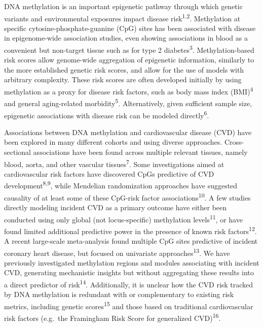 \documentclass[]{article}
\begin{document}
DNA methylation is an important epigenetic pathway through which genetic
variants and environmental exposures impact disease
risk\textsuperscript{1,2}. Methylation at specific
cytosine-phosphate-guanine (CpG) sites has been associated with disease
in epigenome-wide association studies, even showing associations in
blood as a convenient but non-target tissue such as for type 2
diabetes\textsuperscript{3}. Methylation-based risk scores allow
genome-wide aggregation of epigenetic information, similarly to the more
established genetic risk scores, and allow for the use of models with
arbitrary complexity. These risk scores are often developed initially by
using methylation as a proxy for disease risk factors, such as body mass
index (BMI)\textsuperscript{4} and general aging-related
morbidity\textsuperscript{5}. Alternatively, given sufficient sample
size, epigenetic associations with disease risk can be modeled
directly\textsuperscript{6}.

Associations between DNA methylation and cardiovascular disease (CVD)
have been explored in many different cohorts and using diverse
approaches. Cross-sectional associations have been found across multiple
relevant tissues, namely blood, aorta, and other vascular
tissues\textsuperscript{7}. Some investigations aimed at cardiovascular
risk factors have discovered CpGs predictive of CVD
development\textsuperscript{8,9}, while Mendelian randomization
approaches have suggested causality of at least some of these CpG-risk
factor associations\textsuperscript{10}. A few studies directly modeling
incident CVD as a primary outcome have either been conducted using only
global (not locus-specific) methylation levels\textsuperscript{11}, or
have found limited additional predictive power in the presence of known
risk factors\textsuperscript{12}. A recent large-scale meta-analysis
found multiple CpG sites predictive of incident coronary heart disease,
but focused on univariate approaches\textsuperscript{13}. We have
previously investigated methylation regions and modules associating with
incident CVD, generating mechanistic insights but without aggregating
these results into a direct predictor of risk\textsuperscript{14}.
Additionally, it is unclear how the CVD risk tracked by DNA methylation
is redundant with or complementary to existing risk metrics, including
genetic scores\textsuperscript{15} and those based on traditional
cardiovascular risk factors (e.g.~the Framingham Risk Score for
generalized CVD)\textsuperscript{16}.
\end{document}
